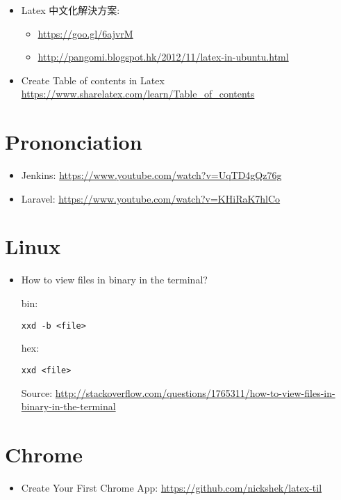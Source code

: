 \documentclass{article}
\begin{document}
\begin{itemize}
\item Latex 中文化解決方案:
  \begin{itemize}
    \item \href{https://goo.gl/6ajvrM}{https://goo.gl/6ajvrM}
    \item \href{http://pangomi.blogspot.hk/2012/11/latex-in-ubuntu.html}{http://pangomi.blogspot.hk/2012/11/latex-in-ubuntu.html}
  \end{itemize}
\item Create Table of contents in Latex \href{https://www.sharelatex.com/learn/Table\_of\_contents}{https://www.sharelatex.com/learn/Table\_of\_contents}
\end{itemize}

\section{Prononciation}

\begin{itemize}
\item Jenkins: \href{https://www.youtube.com/watch?v=UqTD4gQz76g}{https://www.youtube.com/watch?v=UqTD4gQz76g}
\item Laravel: \href{https://www.youtube.com/watch?v=KHiRaK7hlCo}{https://www.youtube.com/watch?v=KHiRaK7hlCo}
\end{itemize}

\section{Linux}

\begin{itemize}
\item How to view files in binary in the terminal?

bin:
\begin{lstlisting}
xxd -b <file>
\end{lstlisting}

hex:
\begin{lstlisting}
xxd <file>
\end{lstlisting}

Source: \href{http://stackoverflow.com/questions/1765311/how-to-view-files-in-binary-in-the-terminal}{http://stackoverflow.com/questions/1765311/how-to-view-files-in-binary-in-the-terminal}

\end{itemize}

\section{Chrome}

\begin{itemize}
\item Create Your First Chrome App: \href{https://github.com/nickshek/latex-til}{https://github.com/nickshek/latex-til}
\end{itemize}
\end{document}
